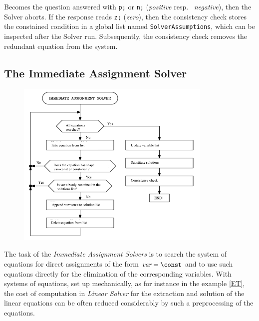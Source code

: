 Becomes the question answered with \verb+p;+ or \verb+n;+ ({\em positive} resp.\ {\em
negative}), then the Solver aborts. If the response reads \verb+z;+ ({\em zero}), then the consistency check stores the constained condition in a global list named \verb+SolverAssumptions+, which can be inspected after the Solver run. Subsequently, the consistency check removes the redundant equation from the system.

\subsection{The Immediate Assignment Solver}

\begin {figure} [htbp]
\begin {center}
\includegraphics[height=8cm]{ImmedEn.png}
\caption {}
\end {center}
\end {figure}


The task of the {\em Immediate Assignment Solvers} is to search the system of equations for direct assignments of the form $\mbox{\em var} = \const$  and to use such equations directly for the elimination of the corresponding variables. With systems of equations, set up  mechanically, as for instance in the example \ref{ET}, the cost of computation  in  {\em Linear Solver}  for the extraction and solution of the linear equations can be often reduced considerably by such a preprocessing of the equations.

